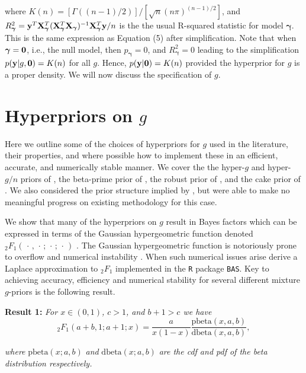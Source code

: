 \documentclass[12pt]{article}
\def\vectorfontone{\bf}
\def\vectorfonttwo{\boldsymbol}
\def\vy{{\vectorfontone y}}                      %
\def\vzero{{\vectorfontone 0}}
\def\vgamma{{\vectorfonttwo \gamma}}             %
\def\matrixfontone{\bf}
\def\mX{{\matrixfontone X}}                      %
\def\ds{\displaystyle}
\begin{document}
\noindent where $K(n) = [\Gamma( (n-1)/2 )]/[\sqrt{n}(n\pi)^{(n-1)/2}]$, and
$R_\vgamma^2 = \vy^T\mX_\vgamma^T(\mX_\vgamma^T\mX_\vgamma)^{-1}\mX_\vgamma^T\vy/n$ is 
the the usual R-squared statistic for model $\vgamma$.
This is the same expression as \cite{Liang2008} Equation (5) 
after simplification. Note that
when $\vgamma = \vzero$, i.e., the null model, then $p_\vgamma = 0$, and
$R_\vgamma^2 = 0$ leading to the simplification $p(\vy|g,\vzero) = K(n)$
for all $g$. Hence, $p(\vy|\vzero) = K(n)$ provided the hyperprior for $g$ is a proper density. We will now discuss the specification of $g$.
 

\section{Hyperpriors on $g$}
\label{sec:hyperpriors}

Here we outline some of the choices of hyperpriors for $g$ used in the literature, their
properties, and where possible how to implement these in an efficient, 
accurate, and
numerically stable manner. We cover the 
the hyper-$g$ and hyper-$g/n$ priors of \cite{Liang2008}, the beta-prime prior
of \cite{Maruyama2011}, the robust prior of \cite{Bayarri2012}, and the cake
prior of \cite{OrmerodEtal2017}.
We also considered the prior structure implied by \cite{Zellner1980}, but were able to make no
meaningful progress on existing methodology for this case.

We show that many of the hyperpriors on $g$ result in Bayes factors which can be expressed
in terms of the Gaussian hypergeometric function denoted 
${}_2F_1(\,\cdot\,,\,\cdot\,;\,\cdot\,;\,\cdot\,)$ \citep[see for example Chapter 15 of ][]{Abramowitz1972}.
The Gaussian hypergeometric function is notoriously prone 
to overflow and numerical instability \citep{Pearson2017}. 
When such numerical issues arise 
\cite{Liang2008} derive a Laplace approximation to ${}_2F_1$ implemented in the {\tt R} package {\tt BAS}.
Key to achieving accuracy, efficiency and numerical stability for several different mixture $g$-priors is the following result.

\bigskip 
\noindent 
{\bf Result 1:} {\it For $x\in(0,1)$, $c>1$, and $b +1 > c$ we have}
\begin{equation}\label{eq:logGuassHypergeometric2}
\ds {}_2F_1(a+b,1;a+1;x) = \frac{a}{x(1 - x)}   \frac{\mbox{pbeta}(x,a,b)}{\mbox{dbeta}(x,a,b)},
\end{equation}

\noindent 
{\it where} $\mbox{pbeta}(x;a,b)$ {\it and} $\mbox{dbeta}(x;a,b)$ {\it are the cdf and pdf of the beta 
distribution respectively.}
\end{document}
